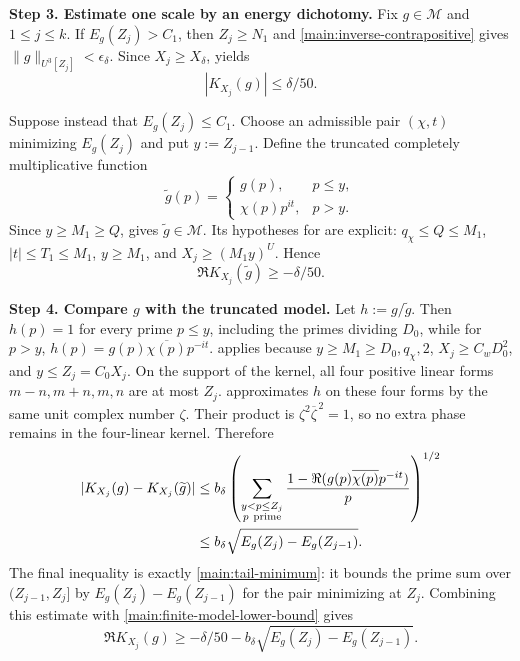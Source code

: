 \documentclass[twoside]{aomart}
\makeatletter
\theoremstyle{paperplain}
\theoremstyle{paperdefinition}
\renewenvironment{proof}[1][\proofname]{\par\pushQED{\qed}%
  \normalfont\topsep6\p@\@plus3\p@\relax\trivlist
  \item[\hskip\labelsep\itshape #1\@addpunct{.}]\ignorespaces
}{\popQED\endtrivlist\@endpefalse}
\numberwithin{equation}{section}
\makeatother
\begin{document}
\begin{proof}
\par
\medskip
\noindent\textbf{Step 3. Estimate one scale by an energy dichotomy.}
Fix $g\in\mathcal M$ and $1\le j\le k$.  If
$E_g(Z_j)>C_1$, then $Z_j\ge N_1$ and
\eqref{main:inverse-contrapositive} gives
$\|g\|_{U^3[Z_j]}<\epsilon_\delta$.  Since $X_j\ge X_\delta$,
 yields
\begin{equation*}
 |K_{X_j}(g)|\le\delta/50.
\end{equation*}

Suppose instead that $E_g(Z_j)\le C_1$.  Choose an admissible pair
$(\chi,t)$ minimizing $E_g(Z_j)$ and put $y:=Z_{j-1}$.  Define the
truncated completely multiplicative function
\begin{equation*}
 \widetilde g(p)=
 \begin{cases}
 g(p),&p\le y,\\
 \chi(p)p^{it},&p>y.
 \end{cases}
\end{equation*}
Since $y\ge M_1\ge Q$,  gives
$\widetilde g\in\mathcal M$.  Its hypotheses for
 are explicit: $q_\chi\le Q\le M_1$,
$|t|\le T_1\le M_1$, $y\ge M_1$, and
$X_j\ge(M_1y)^U$.  Hence
\begin{equation}
 \Re K_{X_j}(\widetilde g)\ge-\delta/50.
 \label{main:finite-model-lower-bound}
\end{equation}

\par
\medskip
\noindent\textbf{Step 4. Compare $g$ with the truncated model.}
Let $h:=g/\widetilde g$.  Then $h(p)=1$ for every prime $p\le y$,
including the primes dividing $D_0$, while for $p>y$,
$h(p)=g(p)\overline{\chi(p)}p^{-it}$.   applies
because $y\ge M_1\ge D_0,q_\chi,2$, $X_j\ge C_wD_0^2$, and
$y\le Z_j=C_0X_j$.  On the support of the kernel, all four positive
linear forms $m-n,m+n,m,n$ are at most $Z_j$.
 approximates $h$ on these four forms by the same
unit complex number $\zeta$.  Their product is
$\zeta^2\overline{\zeta}^{\,2}=1$, so no extra phase remains in the
four-linear kernel.  Therefore
\begin{align*}
 |K_{X_j}(g)-K_{X_j}(\widetilde g)|
 &\le b_\delta
   \left(\sum_{\substack{y<p\le Z_j\\p\ \mathrm{prime}}}
       \frac{1-\Re(g(p)\overline{\chi(p)}p^{-it})}{p}\right)^{1/2}
       \notag\\
 &\le b_\delta\sqrt{E_g(Z_j)-E_g(Z_{j-1})}.
\end{align*}
The final inequality is exactly \eqref{main:tail-minimum}: it bounds the prime sum over $(Z_{j-1},Z_j]$ by $E_g(Z_j)-E_g(Z_{j-1})$ for the pair minimizing at $Z_j$.  Combining this estimate with
\eqref{main:finite-model-lower-bound} gives
\[
 \Re K_{X_j}(g)\ge-\delta/50
 -b_\delta\sqrt{E_g(Z_j)-E_g(Z_{j-1})}.
\]


\end{proof}
\end{document}
